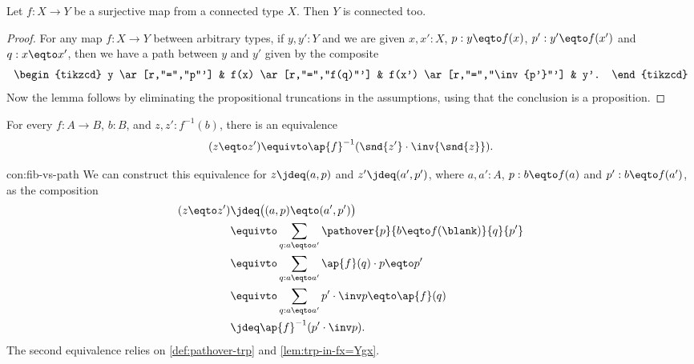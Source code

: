 \begin{lemma}\label{lem:whenisbasespaceconnected}
Let $f:X\to Y$ be a surjective map from a connected type $X$. Then $Y$ is connected too.
\end{lemma}
\begin{proof}
For any map $f:X\to Y$ between arbitrary types, if $y,y':Y$ and we are given
$x,x':X$, $p:y \eqto f(x)$, $p':y' \eqto f(x')$ and $q:x \eqto x'$,
then we have a path between $y$ and $y'$ given by the composite
\[
  \begin{tikzcd}
    y \ar[r,"=","p"'] & f(x) \ar[r,"=","f(q)"'] & f(x') \ar[r,"=","\inv{p'}"'] & y'.
  \end{tikzcd}
\]
Now the lemma follows by eliminating the propositional truncations in the assumptions,
using that the conclusion is a proposition.
\end{proof}

\begin{construction}\label{con:fib-vs-path}
  For every $f:A\to B$, $b:B$, and $z,z' : f^{-1}(b)$,
  there is an equivalence
  \begin{equation}\label{eq:fib_vs-path}
    (z \eqto z') \equivto \ap{f}^{-1}(\snd{z'} \cdot \inv{\snd{z}}).
  \end{equation}
\end{construction}

\begin{implementation}{con:fib-vs-path}
  We can construct this equivalence for $z\jdeq(a,p)$ and $z'\jdeq(a',p')$,
  where $a,a':A$, $p:b \eqto f(a)$ and $p':b \eqto f(a')$,
  as the composition
  \begin{align*}
    (z \eqto z')
    &\jdeq \bigl( (a,p) \eqto (a',p') \bigr) \\
    &\equivto \sum_{q : a \eqto a'} \pathover{p}{b \eqto f(\blank)}{q}{p'} \\
    &\equivto \sum_{q : a \eqto a'} \ap{f}(q) \cdot p \eqto p' \\
    &\equivto \sum_{q : a \eqto a'} p' \cdot \inv p \eqto \ap{f}(q) \\
    &\jdeq \ap{f}^{-1}(p' \cdot \inv p).
  \end{align*}
  The second equivalence relies on \cref{def:pathover-trp}
  and \cref{lem:trp-in-fx=Ygx}.
\end{implementation}

